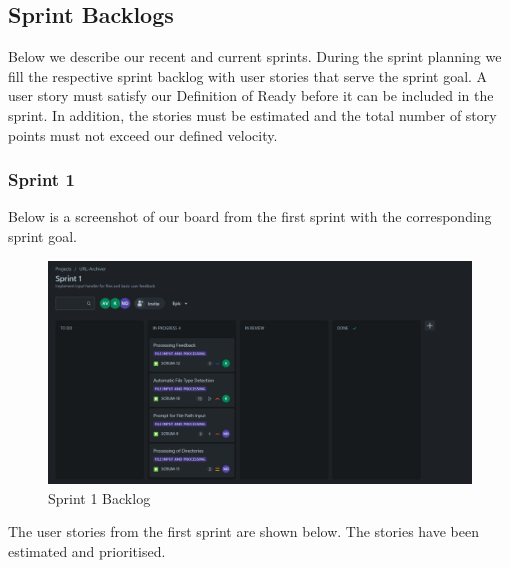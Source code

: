 \subsection{Sprint Backlogs}
Below we describe our recent and current sprints.
During the sprint planning we fill the respective sprint backlog with user stories that serve the sprint goal.
A user story must satisfy our Definition of Ready before it can be included in the sprint.
In addition, the stories must be estimated and the total number of story points must not exceed our defined velocity.

\subsubsection{Sprint 1}
Below is a screenshot of our board from the first sprint with the corresponding sprint goal.
\begin{figure}[h!]
    \centering
    \includegraphics[width=1\textwidth]{pictures/backlog_sprint_1}
    \caption{Sprint 1 Backlog}
    \label{fig:backlog_sprint_1}
\end{figure}

The user stories from the first sprint are shown below. The stories have been estimated and prioritised.

